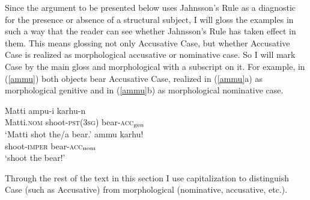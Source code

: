 \documentclass[output=paper,
modfonts
]{LSP/langsci}
\newcommand{\rf}[1]{(\ref{#1})}
\newcommand{\rfa}[2]{(\ref{#1}{#2})}
\def\trf#1{$_{\textrm{\scriptsize{#1}}}$}
\begin{document}
Since the argument to be presented below uses Jahnsson's Rule as a diagnostic for the presence
or absence of a structural subject, I will gloss the examples in such a way that the reader can
see whether Jahnsson's Rule has taken effect in them.  This means glossing not only
 Accusative Case, but whether  Accusative Case is realized as
morphological accusative  or nominative case. So I will mark  Case by the
main gloss and morphological  with a subscript on it.  For example, in \rf{ammu} both
objects bear  Accusative Case, realized in \rfa{ammu}{a} as morphological
genitive  and in \rfa{ammu}{b} as morphological nominative case.
\begin{exe}
\ex\label{ammu}
	\ea \gll Matti ampu-i karhu-n \\
		Matti.\textsc{nom} shoot-\textsc{pst}(\textsc{3sg}) bear-\textsc{acc\trf{gen}}\\
		\glt `Matti shot the/a bear.' 
	\ex \gll ammu karhu! \\
		shoot-\textsc{imper} bear-\textsc{acc\trf{nom}}\\
		\glt `shoot the bear!'
	\z
\end{exe}
Through the rest of the text in this section I use capitalization to distinguish
 Case (such as Accusative) from morphological  (nominative, accusative,
etc.).
\end{document}
